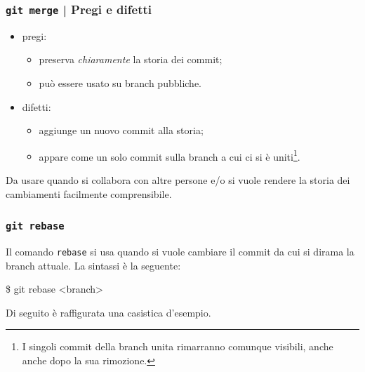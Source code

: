 \documentclass{beamer}
\begin{document}
\begin{frame}
  \frametitle{\texttt{git merge} | Pregi e difetti}
  \begin{itemize}
    \item pregi: \begin{itemize}
      \item preserva \emph{chiaramente} la storia dei commit;
      \item pu\`o essere usato su branch pubbliche.
    \end{itemize}
    \item difetti: \begin{itemize}
      \item aggiunge un nuovo commit alla storia;
      \item appare come un solo commit sulla branch a cui ci si \`e uniti\footnote{
          I singoli commit della branch unita rimarranno comunque visibili, anche
          anche dopo la sua rimozione.
        }.
    \end{itemize}
  \end{itemize}

  Da usare quando si collabora con altre persone e/o si vuole rendere la storia
  dei cambiamenti facilmente comprensibile.
\end{frame}

\begin{frame}
  \frametitle{\texttt{git rebase}}
  Il comando \texttt{rebase} si usa quando si vuole cambiare il commit da cui si
  dirama la branch attuale. La sintassi \`e la seguente:
  \begin{semiverbatim}
  \$ git rebase <branch>
  \end{semiverbatim}
  Di seguito \`e raffigurata una casistica d'esempio.

  \begin{figure}
  \end{figure}
\end{frame}
\end{document}

